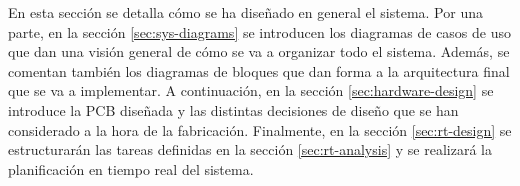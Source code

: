 En esta sección se detalla cómo se ha diseñado en general el sistema. Por una parte,
en la sección \ref{sec:sys-diagrams} se introducen los diagramas de casos de uso que dan
una visión general de cómo se va a organizar todo el sistema. Además, se comentan
también los diagramas de bloques que dan forma a la arquitectura final que se va
a implementar. A continuación, en la sección \ref{sec:hardware-design} se introduce
la PCB diseñada y las distintas decisiones de diseño que se han considerado a la hora
de la fabricación. Finalmente, en la sección \ref{sec:rt-design} se estructurarán
las tareas definidas en la sección \ref{sec:rt-analysis} y se realizará la
planificación en tiempo real del sistema.
